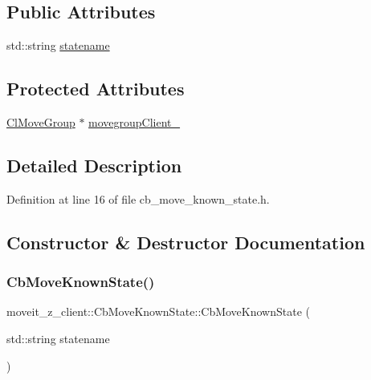 \subsection*{Public Attributes}
\begin{DoxyCompactItemize}
\item 
std\+::string \hyperlink{classmoveit__z__client_1_1CbMoveKnownState_a53449b08ffa077adb2f1d4efbd37f8d0}{statename}
\end{DoxyCompactItemize}
\subsection*{Protected Attributes}
\begin{DoxyCompactItemize}
\item 
\hyperlink{classmoveit__z__client_1_1ClMoveGroup}{Cl\+Move\+Group} $\ast$ \hyperlink{classmoveit__z__client_1_1CbMoveKnownState_a474f1470f8714411a676b9341a95130e}{movegroup\+Client\+\_\+}
\end{DoxyCompactItemize}


\subsection{Detailed Description}


Definition at line 16 of file cb\+\_\+move\+\_\+known\+\_\+state.\+h.



\subsection{Constructor \& Destructor Documentation}
\mbox{\label{classmoveit__z__client_1_1CbMoveKnownState_a979cd1c7a80b314c921c8ff89867a3fa}} 
\subsubsection{\texorpdfstring{Cb\+Move\+Known\+State()}{CbMoveKnownState()}\hspace{0.1cm}{\footnotesize\ttfamily [1/2]}}
{\footnotesize\ttfamily moveit\+\_\+z\+\_\+client\+::\+Cb\+Move\+Known\+State\+::\+Cb\+Move\+Known\+State (\begin{DoxyParamCaption}\item[{std\+::string}]{statename }\end{DoxyParamCaption})}



